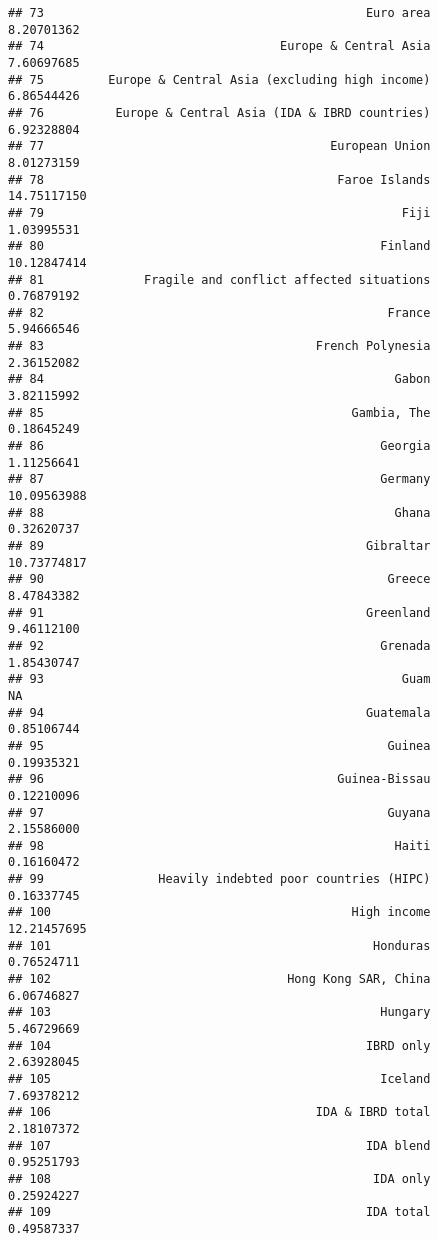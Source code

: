 \documentclass[]{article}
\begin{document}
\begin{verbatim}
## 73                                             Euro area  8.20701362
## 74                                 Europe & Central Asia  7.60697685
## 75         Europe & Central Asia (excluding high income)  6.86544426
## 76          Europe & Central Asia (IDA & IBRD countries)  6.92328804
## 77                                        European Union  8.01273159
## 78                                         Faroe Islands 14.75117150
## 79                                                  Fiji  1.03995531
## 80                                               Finland 10.12847414
## 81              Fragile and conflict affected situations  0.76879192
## 82                                                France  5.94666546
## 83                                      French Polynesia  2.36152082
## 84                                                 Gabon  3.82115992
## 85                                           Gambia, The  0.18645249
## 86                                               Georgia  1.11256641
## 87                                               Germany 10.09563988
## 88                                                 Ghana  0.32620737
## 89                                             Gibraltar 10.73774817
## 90                                                Greece  8.47843382
## 91                                             Greenland  9.46112100
## 92                                               Grenada  1.85430747
## 93                                                  Guam          NA
## 94                                             Guatemala  0.85106744
## 95                                                Guinea  0.19935321
## 96                                         Guinea-Bissau  0.12210096
## 97                                                Guyana  2.15586000
## 98                                                 Haiti  0.16160472
## 99                Heavily indebted poor countries (HIPC)  0.16337745
## 100                                          High income 12.21457695
## 101                                             Honduras  0.76524711
## 102                                 Hong Kong SAR, China  6.06746827
## 103                                              Hungary  5.46729669
## 104                                            IBRD only  2.63928045
## 105                                              Iceland  7.69378212
## 106                                     IDA & IBRD total  2.18107372
## 107                                            IDA blend  0.95251793
## 108                                             IDA only  0.25924227
## 109                                            IDA total  0.49587337

\end{verbatim}
\end{document}
